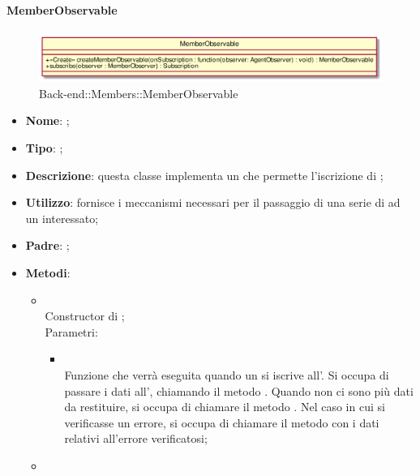 \hypertarget{MemberObservable_label}{\paragraph{MemberObservable}}
\begin{figure}[h]
	\centering
	\includegraphics[width=\textwidth,height=\textheight,keepaspectratio]{images/ClassMemberObservable.png}
	\caption{Back-end::Members::MemberObservable}
\end{figure}
\begin{itemize}
	\item \textbf{Nome}: ;
	\item \textbf{Tipo}: ;
	\item \textbf{Descrizione}: questa classe implementa un  che permette l'iscrizione di ;
	\item \textbf{Utilizzo}: fornisce i meccanismi necessari per il passaggio di una serie di  ad un  interessato;
	\item \textbf{Padre}: ;
	\item \textbf{Metodi}:
	\begin{itemize}
		\item[]  \\
		Constructor di ;\\
		Parametri:
		\begin{itemize}
			\item {} \\
			Funzione che verrà eseguita quando un  si iscrive all'. Si occupa di passare i dati all', chiamando il metodo . Quando non ci sono più dati da restituire, si occupa di chiamare il metodo . Nel caso in cui si verificasse un errore, si occupa di chiamare il metodo  con i dati relativi all'errore verificatosi;
		\end{itemize}
		\item[]  \\

\end{itemize}
\end{itemize}
